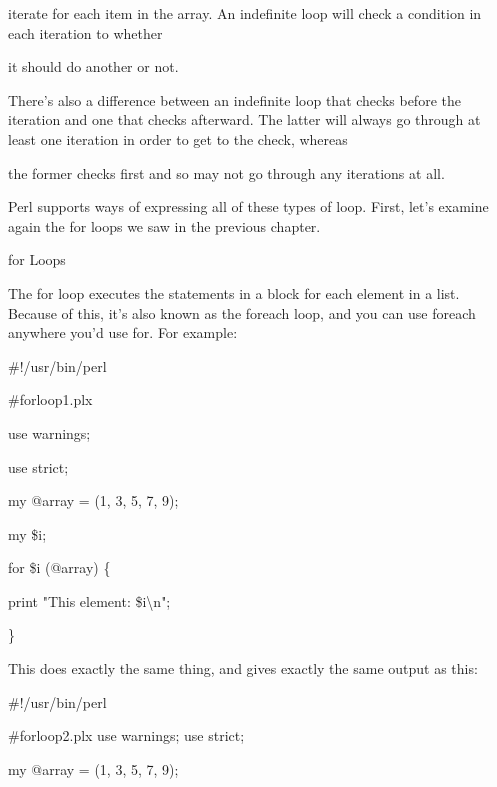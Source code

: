 \documentclass[a4paper,11pt]{book}
\begin{document}
\noindent iterate for each item in the array. An indefinite loop will check a condition in each iteration to whether

\noindent it should do another or not.

\noindent 

\noindent There's also a difference between an indefinite loop that checks before the iteration and one that checks afterward. The latter will always go through at least one iteration in order to get to the check, whereas

\noindent the former checks first and so may not go through any iterations at all.

\noindent 

\noindent Perl supports ways of expressing all of these types of loop. First, let's examine again the for loops we saw in the previous chapter.

\noindent 

\noindent for Loops

\noindent 

\noindent The for loop executes the statements in a block for each element in a list. Because of this, it's also known as the foreach loop, and you can use foreach anywhere you'd use for. For example:

\noindent 

\noindent 

\noindent \#!/usr/bin/perl

\noindent \#forloop1.plx

\noindent use warnings;

\noindent use strict;

\noindent 

\noindent my @array = (1, 3, 5, 7, 9);

\noindent my \$i;

\noindent for \$i (@array) \{

\noindent print "This element: \$i\textbackslash n";

\noindent \}

\noindent 

\noindent This does exactly the same thing, and gives exactly the same output as this:

\noindent 

\noindent 

\noindent \#!/usr/bin/perl

\noindent \#forloop2.plx use warnings; use strict;

\noindent 

\noindent my @array = (1, 3, 5, 7, 9);
\end{document}
